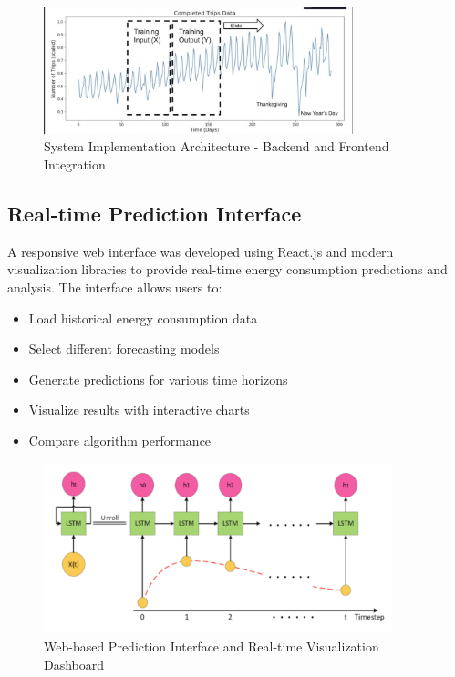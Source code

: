 \documentclass[12pt,a4paper]{report}
\begin{document}
\begin{figure}[H]
    \centering
    \includegraphics[width=0.8\textwidth]{1.png}
    \caption{System Implementation Architecture - Backend and Frontend Integration}
    \label{fig:system_implementation}
\end{figure}

\subsection{Real-time Prediction Interface}
A responsive web interface was developed using React.js and modern visualization libraries to provide real-time energy consumption predictions and analysis. The interface allows users to:
\begin{itemize}
\item Load historical energy consumption data
\item Select different forecasting models
\item Generate predictions for various time horizons
\item Visualize results with interactive charts
\item Compare algorithm performance
\end{itemize}

\begin{figure}[H]
    \centering
    \includegraphics[width=0.9\textwidth]{2.png}
    \caption{Web-based Prediction Interface and Real-time Visualization Dashboard}
    \label{fig:web_interface}
\end{figure}
\end{document}
